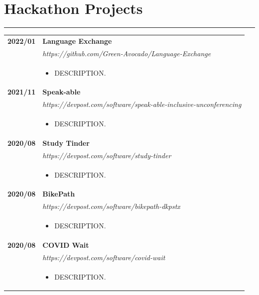 \documentclass[letterpaper]{article}
\newcommand{\sect}[1]{\section*{#1}
                        {\color{cyan}
                        \rule{\textwidth}{1pt}
                        \vspace{-1ex}}}
\begin{document}
    \sect{Hackathon Projects}

        \begin{tabular}{p{} p{}} 
            \textbf{2022/01} & \textbf{Language Exchange} \\
            & \emph{https://github.com/Green-Avocado/Language-Exchange} \\
            & \begin{itemize}
                \item DESCRIPTION.
            \end{itemize}
            \\
            \textbf{2021/11} & \textbf{Speak-able} \\
            & \emph{https://devpost.com/software/speak-able-inclusive-unconferencing} \\
            & \begin{itemize}
                \item DESCRIPTION.
            \end{itemize}
            \\
            \textbf{2020/08} & \textbf{Study Tinder} \\
            & \emph{https://devpost.com/software/study-tinder} \\
            & \begin{itemize}
                \item DESCRIPTION.
            \end{itemize}
            \\
            \textbf{2020/08} & \textbf{BikePath} \\
            & \emph{https://devpost.com/software/bikepath-dkpstx} \\
            & \begin{itemize}
                \item DESCRIPTION.
            \end{itemize}
            \\
            \textbf{2020/08} & \textbf{COVID Wait} \\
            & \emph{https://devpost.com/software/covid-wait} \\
            & \begin{itemize}
                \item DESCRIPTION.
            \end{itemize}
            \\
        \end{tabular}
\end{document}

